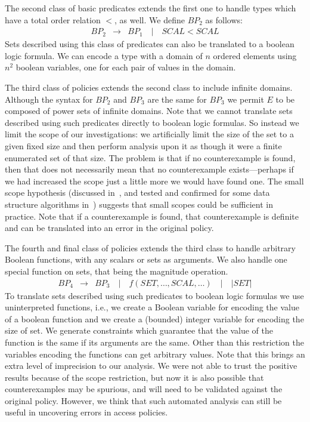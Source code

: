 The second class of basic predicates extends the first one to handle
types which have a total order relation $<$, as well.  We define
$BP_2$ as follows:
\begin{eqnarray*}
 BP_2 & \rightarrow & BP_1 \quad | \quad SCAL < SCAL 
\end{eqnarray*}
Sets described using this class of predicates can also be translated
to a boolean logic formula. We can encode a type with a domain of $n$
ordered elements using $n^2$ boolean variables, one for each pair of
values in the domain.

The third class of policies extends the second class to include
infinite domains. Although the syntax for $BP_2$ and $BP_3$ are the
same for $BP_3$ we permit $E$ to be composed of power sets of infinite
domains.  Note that we cannot translate sets described using such
predicates directly to boolean logic formulas.  So instead we limit
the scope of our investigations: we artificially limit the size of the
set to a given fixed size and then perform analysis upon it as though
it were a finite enumerated set of that size. The problem is that if
no counterexample is found, then that does not necessarily mean that
no counterexample exists---perhaps if we had increased the scope just
a little more we would have found one. The small scope hypothesis
(discussed in~\cite{jackson:elements}, and tested and confirmed for
some data structure algorithms in~\cite{marinov:exhaustive}) suggests
that small scopes could be sufficient in practice. Note that if a
counterexample is found, that counterexample is definite and can be
translated into an error in the original policy.

The fourth and final class of policies extends the third class to
handle arbitrary Boolean functions, with any scalars or sets as
arguments. We also handle one special function on sets, that being the
magnitude operation.
\begin{eqnarray*}
  BP_4 & \rightarrow & BP_3 \quad | \quad f (SET, \dots, SCAL, \dots)
\quad | \quad | SET | 
\end{eqnarray*}
To translate sets described using such predicates to boolean logic
formulas we use uninterpreted functions, i.e., we create a Boolean
variable for encoding the value of a boolean function and we create a
(bounded) integer variable for encoding the size of set. We generate
constraints which guarantee that the value of the function is the same
if its arguments are the same. Other than this restriction the
variables encoding the functions can get arbitrary values.  Note that
this brings an extra level of imprecision to our analysis.  We were
not able to trust the positive results because of the scope
restriction, but now it is also possible that counterexamples may be
spurious, and will need to be validated against the original policy.
However, we think that such automated analysis can still be useful in
uncovering errors in access policies.

